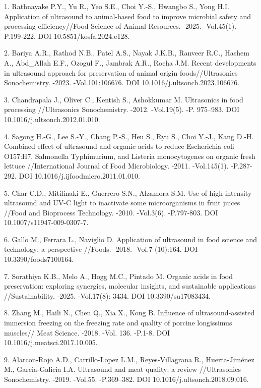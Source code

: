 \begin{refs}
1. Rathnayake P.Y., Yu R., Yeo S.E., Choi Y.-S., Hwangbo S., Yong H.I.
Application of ultrasound to animal-based food to improve microbial
safety and processing efficiency//Food Science of Animal Resources.
-2025. -Vol.45(1). -P.199-222. DOI 10.5851/kosfa.2024.e128.

2. Bariya A.R., Rathod N.B., Patel A.S., Nayak J.K.B., Ranveer R.C.,
Hashem A., Abd\_Allah E.F., Ozogul F., Jambrak A.R., Rocha J.M. Recent
developments in ultrasound approach for preservation of animal origin
foods//Ultrasonics Sonochemistry. -2023. -Vol.101:106676. DOI
10.1016/j.ultsonch.2023.106676.

3. Chandrapala J., Oliver C., Kentish S., Ashokkumar M. Ultrasonics in
food processing //Ultrasonics Sonochemistry. -2012. -Vol.19(5). -P.
975--983. DOI 10.1016/j.ultsonch.2012.01.010.

4. Sagong H.-G., Lee S.-Y., Chang P.-S., Heu S., Ryu S., Choi Y.-J., Kang
D.-H. Combined effect of ultrasound and organic acids to reduce
Escherichia coli O157:H7, Salmonella Typhimurium, and Listeria
monocytogenes on organic fresh lettuce //International Journal of Food
Microbiology. -2011. -Vol.145(1). -P.287-292. DOI
10.1016/j.ijfoodmicro.2011.01.010.

5. Char C.D., Mitilinaki E., Guerrero S.N., Alzamora S.M. Use of
high-intensity ultrasound and UV-C light to inactivate some
microorganisms in fruit juices //Food and Bioprocess Technology.
-2010. -Vol.3(6). -P.797-803. DOI 10.1007/s11947-009-0307-7.

6. Gallo M., Ferrara L., Naviglio D. Application of ultrasound in food
science and technology: a perspective //Foods. -2018. -Vol.7
(10):164. DOI 10.3390/foods7100164.

7. Sorathiya K.B., Melo A., Hogg M.C., Pintado M. Organic acids in food
preservation: exploring synergies, molecular insights, and sustainable
applications //Sustainability. -2025. -Vol.17(8): 3434. DOI
10.3390/su17083434.

8. Zhang M., Haili N., Chen Q., Xia X., Kong B. Influence of
ultrasound-assisted immersion freezing on the freezing rate and
quality of porcine longissimus muscles// Meat Science. -2018. -Vol.
136. -P.1-8. DOI 10.1016/j.meatsci.2017.10.005.

9. Alarcon-Rojo A.D., Carrillo-Lopez L.M., Reyes-Villagrana R.,
Huerta-Jiménez M., Garcia-Galicia I.A. Ultrasound and meat quality: a
review //Ultrasonics Sonochemistry. -2019. -Vol.55. -P.369--382. DOI
10.1016/j.ultsonch.2018.09.016.


\end{refs}
